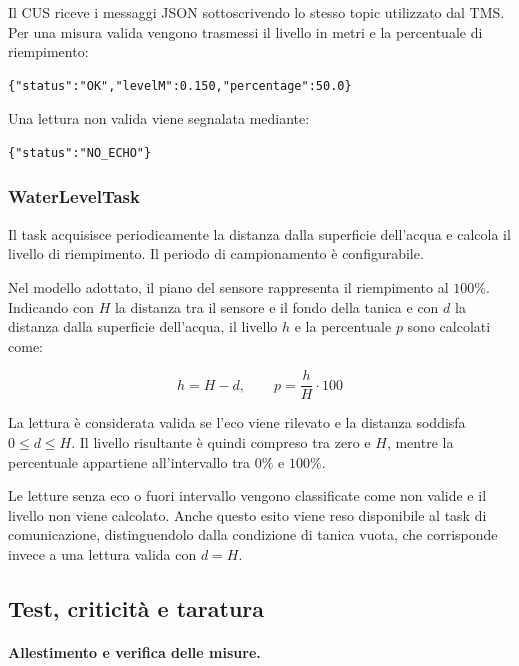 Il CUS riceve i messaggi JSON sottoscrivendo
lo stesso topic utilizzato dal TMS.
Per una misura valida vengono trasmessi il livello
in metri e la percentuale di riempimento:

\begin{verbatim}
{"status":"OK","levelM":0.150,"percentage":50.0}
\end{verbatim}

Una lettura non valida viene segnalata mediante:

\begin{verbatim}
{"status":"NO_ECHO"}
\end{verbatim}


\subsubsection{WaterLevelTask}%
\label{subsec:tms-water-level}

Il task acquisisce periodicamente la distanza dalla
superficie dell'acqua e calcola il livello
di riempimento.
Il periodo di campionamento è configurabile.

Nel modello adottato, il piano del sensore rappresenta
il riempimento al \(100\%\).
Indicando con \(H\) la distanza tra il sensore
e il fondo della tanica e con \(d\) la distanza
dalla superficie dell'acqua, il livello \(h\)
e la percentuale \(p\) sono calcolati come:

\[
    h = H - d,
    \qquad
    p = \frac{h}{H} \cdot 100
\]

La lettura è considerata valida se l'eco viene rilevato
e la distanza soddisfa \(0 \leq d \leq H\).
Il livello risultante è quindi compreso tra zero
e \(H\), mentre la percentuale appartiene
all'intervallo tra \(0\%\) e \(100\%\).

Le letture senza eco o fuori intervallo vengono
classificate come non valide e il livello
non viene calcolato.
Anche questo esito viene reso disponibile al task
di comunicazione, distinguendolo dalla condizione
di tanica vuota, che corrisponde invece a una lettura
valida con \(d = H\).


\subsection{Test, criticità e taratura}%
\label{subsec:tms-tests}

\paragraph{Allestimento e verifica delle misure.}

